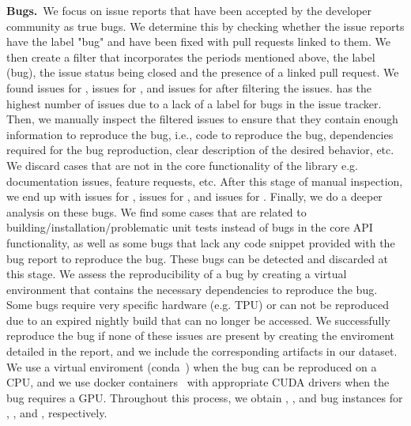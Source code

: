 \documentclass[sigconf,screen]{acmart}
\begin{document}



\textbf{Bugs.}~We focus on issue reports that have been accepted by
the developer community as true bugs. We determine this by checking
whether the issue reports have the label "bug" and have been fixed with pull
requests linked to them. We then create a filter that incorporates
the periods mentioned above, the label (bug), the issue status being closed
and the presence of a linked pull request. We found \numtorchfiltered{}
issues for \torch, \numtffiltered{} issues for \tf, and \numjaxfiltered{}
issues for \jax after filtering the issues. \torch has the highest number
of issues due to a lack of a label for bugs in the issue tracker.
Then, we manually inspect the filtered issues to ensure that they
contain enough information to reproduce the bug, i.e., code to
reproduce the bug, dependencies required for the bug reproduction,
clear description of the desired behavior, etc. We discard cases that
are not in the core functionality of the library e.g. documentation
issues, feature requests, etc. After this stage of manual inspection,
we end up with \numtorchinspected{} issues for \torch,
\numtfinspected{} issues for \tf, and \numjaxinspected{} issues for
\jax.
%
Finally, we do a deeper analysis on these bugs. We find some cases that
are related to building/installation/problematic unit tests instead of
bugs in the core API functionality, as well as some bugs that lack any
code snippet provided with the bug report to reproduce the bug. These
bugs can be detected and discarded at this stage.
We assess the reproducibility of a bug by creating a
virtual environment that contains the necessary dependencies to
reproduce the bug. Some bugs require very specific hardware (e.g. TPU) 
or can not be reproduced due to an expired nightly build that can no
longer be accessed. We successfully reproduce the bug if none of these
issues are present by
creating the enviroment detailed in the report, and we include the
corresponding artifacts in our dataset. We use a virtual enviroment
(conda~\cite{venv}) when the bug can be reproduced on a CPU, and we use docker
containers~\cite{merkel2014docker} with appropriate CUDA drivers when the bug 
requires a GPU.
Throughout this process, we
obtain \textbf{\numjaxbugs{}}, \textbf{\numtorchbugs{}}, and
\textbf{\numtfbugs{}} bug instances for \jax, \torch, and \tf,
respectively.
\end{document}
